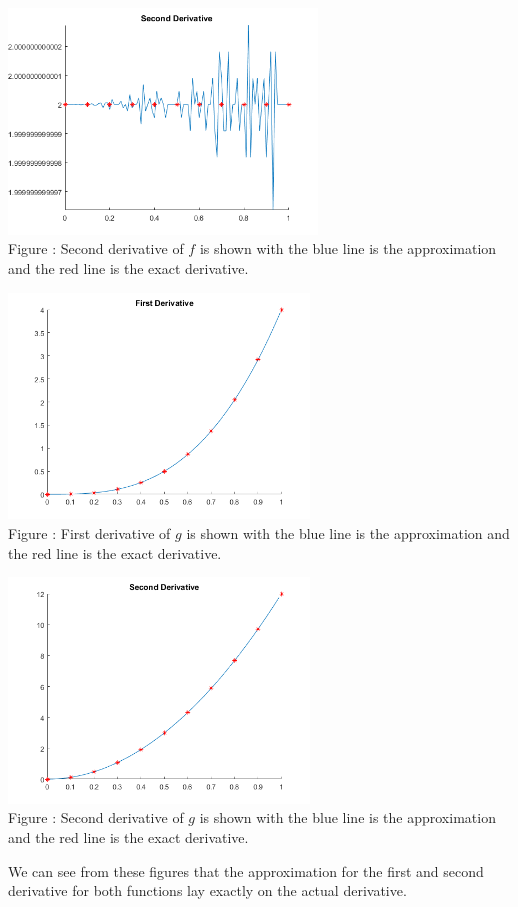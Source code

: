 \documentclass{article}
\begin{document}
\includegraphics[height=6cm]{f_fpp}\\
Figure : Second derivative of $f$ is shown with the blue line is the approximation and the red line is the exact derivative. 

\includegraphics[height=6cm]{g_fp}\\
Figure : First derivative of $g$ is shown with the blue line is the approximation and the red line is the exact derivative. 

\includegraphics[height=6cm]{g_fpp}\\
Figure : Second derivative of $g$ is shown with the blue line is the approximation and the red line is the exact derivative. 


We can see from these figures that the approximation for the first and second derivative for both functions lay exactly on the actual derivative. 
\end{document}
